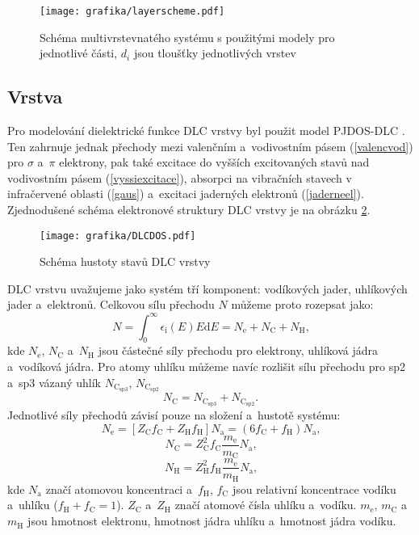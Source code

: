 \begin{figure}[h]
\centering
\texttt{[image: grafika/layerscheme.pdf]}
\caption{Schéma multivrstevnatého systému s použitými modely pro jednotlivé části, $d_i$ jsou tloušťky jednotlivých vrstev}
\label{layerscheme}
\end{figure} 

\subsection{Vrstva}
Pro modelování dielektrické funkce DLC vrstvy byl použit model PJDOS-DLC \cite{Franta2007}. Ten zahrnuje jednak přechody mezi valenčním a~vodivostním pásem (\ref{valencvod}) pro $\sigma$ a~$\pi$ elektrony, pak také excitace do vyšších excitovaných stavů nad vodivostním pásem (\ref{vyssiexcitace}), absorpci na vibračních stavech v infračervené oblasti (\ref{gaus}) a~excitaci jaderných elektronů (\ref{jaderneel}). Zjednodušené schéma elektronové struktury DLC vrstvy je na obrázku \ref{DLCDOS}.

\begin{figure}[h]
\centering
\texttt{[image: grafika/DLCDOS.pdf]}
\caption{Schéma hustoty stavů DLC vrstvy}
\label{DLCDOS}
\end{figure} 

DLC vrstvu uvažujeme jako systém tří komponent: vodíkových jader, uhlíkových jader a~elektronů. Celkovou sílu přechodu $N$ můžeme proto rozepsat jako:
\begin{equation}
N = \int_0^\infty \epsilon_\mathrm{i}(E) E \mathrm{d}E = N_\mathrm{e} + N_\mathrm{C} + N_\mathrm{H} \text{,}
\end{equation} 
kde $N_\mathrm{e}$, $N_\mathrm{C}$ a~$N_\mathrm{H}$ jsou částečné síly přechodu pro elektrony, uhlíková jádra a~vodíková jádra. Pro atomy uhlíku můžeme navíc rozlišit sílu přechodu pro sp2 a~sp3 vázaný uhlík $N_\mathrm{C_{sp3}}$, $N_\mathrm{C_{sp2}}$
\begin{equation}
N_\mathrm{C} = N_\mathrm{C_{sp3}} + N_\mathrm{C_{sp2}} \text{.}
\end{equation} 
Jednotlivé síly přechodů závisí pouze na složení a~hustotě systému:
\begin{equation}
N_\mathrm{e} = [Z_\mathrm{C}f_\mathrm{C} + Z_\mathrm{H} f_\mathrm{H}] N_\mathrm{a} = (6f_\mathrm{C} + f_\mathrm{H})N_\mathrm{a} \text{,}
\end{equation}
\begin{equation}
N_\mathrm{C} = Z^2_\mathrm{C} f_\mathrm{C} \frac{m_\mathrm{e}}{m_\mathrm{C}} N_\mathrm{a} \text{,}
\end{equation}
\begin{equation}
N_\mathrm{H} = Z^2_\mathrm{H} f_\mathrm{H} \frac{m_\mathrm{e}}{m_\mathrm{H}} N_\mathrm{a} \text{,}
\end{equation}
kde $N_\mathrm{a}$ značí atomovou koncentraci a~$f_\mathrm{H}$, $f_\mathrm{C}$ jsou relativní koncentrace vodíku a~uhlíku ($f_\mathrm{H} + f_\mathrm{C} = 1 $). $Z_\mathrm{C}$ a~$Z_\mathrm{H}$ značí atomové čísla uhlíku a~vodíku. $m_\mathrm{e}$, $m_\mathrm{C}$ a~$m_\mathrm{H}$ jsou hmotnost elektronu, hmotnost jádra uhlíku a~hmotnost jádra vodíku. 

